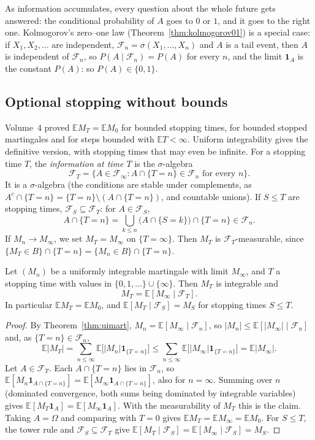As information accumulates, every question about the whole future gets answered: the conditional probability of $A$ goes to $0$ or $1$, and it goes to the right one. Kolmogorov's zero--one law
(Theorem~\ref{thm:kolmogorov01}) is a special case: if $X_1,X_2,\dots$ are independent, $\mathcal F_n=\sigma(X_1,\dots,X_n)$ and $A$ is a tail event, then $A$ is independent of $\mathcal F_n$, so
$P(A\mid\mathcal F_n)=P(A)$ for every $n$, and the limit $\mathbf 1_A$ is the constant $P(A)$: so $P(A)\in\{0,1\}$.

\subsection*{Optional stopping without bounds}

Volume~4 proved $\mathbb EM_T=\mathbb EM_0$ for bounded stopping times, for bounded stopped martingales and for steps bounded with $\mathbb ET<\infty$. Uniform integrability gives the
definitive version, with stopping times that may even be infinite. For a stopping time $T$, the \emph{information at time $T$} is the $\sigma$-algebra
\[
\mathcal F_T=\bigl\{A\in\mathcal F_\infty:A\cap\{T=n\}\in\mathcal F_n\text{ for every }n\bigr\}.
\]
It is a $\sigma$-algebra (the conditions are stable under complements, as $A^c\cap\{T=n\}=\{T=n\}\setminus(A\cap\{T=n\})$, and countable unions). If $S\le T$ are stopping times, $\mathcal F_S\subseteq\mathcal F_T$: for $A\in\mathcal F_S$,
\[
A\cap\{T=n\}=\bigcup_{k\le n}\bigl(A\cap\{S=k\}\bigr)\cap\{T=n\}\in\mathcal F_n.
\]
If $M_n\to M_\infty$, we set $M_T=M_\infty$ on $\{T=\infty\}$. Then $M_T$ is $\mathcal F_T$-measurable, since $\{M_T\in B\}\cap\{T=n\}=\{M_n\in B\}\cap\{T=n\}$.

\begin{theorem}\label{thm:uiost}
Let $(M_n)$ be a uniformly integrable martingale with limit $M_\infty$, and $T$ a stopping time with values in $\{0,1,\dots\}\cup\{\infty\}$. Then $M_T$ is integrable and
\[
M_T=\mathbb E[M_\infty\mid\mathcal F_T].
\]
In particular $\mathbb EM_T=\mathbb EM_0$, and $\mathbb E[M_T\mid\mathcal F_S]=M_S$ for stopping times $S\le T$.
\end{theorem}
\begin{proof}
By Theorem~\ref{thm:uimart}, $M_n=\mathbb E[M_\infty\mid\mathcal F_n]$, so $|M_n|\le\mathbb E[|M_\infty|\mid\mathcal F_n]$ and, as $\{T=n\}\in\mathcal F_n$,
\[
\mathbb E|M_T|=\sum_{n\le\infty}\mathbb E\bigl[|M_n|\mathbf 1_{\{T=n\}}\bigr]\le\sum_{n\le\infty}\mathbb E\bigl[|M_\infty|\mathbf 1_{\{T=n\}}\bigr]=\mathbb E|M_\infty|.
\]
Let $A\in\mathcal F_T$. Each $A\cap\{T=n\}$ lies in $\mathcal F_n$, so $\mathbb E[M_n\mathbf 1_{A\cap\{T=n\}}]=\mathbb E[M_\infty\mathbf 1_{A\cap\{T=n\}}]$, also for $n=\infty$. Summing over $n$ (dominated convergence, both
sums being dominated by integrable variables) gives $\mathbb E[M_T\mathbf 1_A]=\mathbb E[M_\infty\mathbf 1_A]$. With the measurability of $M_T$ this is the claim. Taking $A=\Omega$ and comparing with
$T=0$ gives $\mathbb EM_T=\mathbb EM_\infty=\mathbb EM_0$. For $S\le T$, the tower rule and $\mathcal F_S\subseteq\mathcal F_T$ give
$\mathbb E[M_T\mid\mathcal F_S]=\mathbb E[M_\infty\mid\mathcal F_S]=M_S$.
\end{proof}

